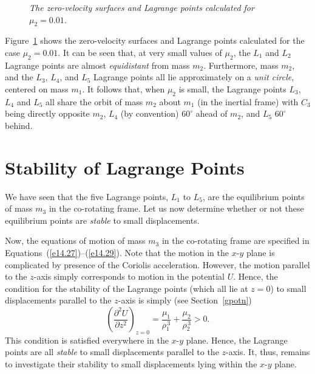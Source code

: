 \begin{figure}
\epsfysize=5in
\centerline{}
\caption{\em The zero-velocity surfaces and Lagrange points calculated for $\mu_2=0.01$.}\label{fzer}
\end{figure}

Figure~\ref{fzer} shows the zero-velocity surfaces and Lagrange points
calculated for the case $\mu_2=0.01$. It can be seen that, at very small values of
$\mu_2$, the $L_1$ and $L_2$ Lagrange points are almost {\em equidistant}\/ from mass $m_2$.
Furthermore, mass $m_2$, and the  $L_3$, $L_4$, and $L_5$ Lagrange points all lie  approximately  
on a {\em unit circle}, 
centered on mass $m_1$. It follows that, when $\mu_2$ is small, the Lagrange points $L_3$, $L_4$ and $L_5$ all
share the orbit of mass $m_2$ about $m_1$ (in the inertial frame) with $C_3$ being directly opposite $m_2$,
$L_4$ (by convention) $60^\circ$ ahead of $m_2$, and $L_5$ $60^\circ$ behind.

\section{Stability of Lagrange Points}
We have seen that the five Lagrange points, $L_1$ to $L_5$, are the equilibrium points
of mass $m_3$ in the co-rotating frame. Let us now determine whether or not
these equilibrium points are {\em stable}\/ to small displacements. 

Now, the equations of motion of mass $m_3$ in the co-rotating frame are
specified in Equations~(\ref{e14.27})--(\ref{e14.29}). Note that the motion
in the $x$-$y$ plane is complicated by presence of  the Coriolis acceleration. However, the motion parallel to the $z$-axis simply
corresponds to motion in the potential $U$. Hence, the condition for 
the stability of the Lagrange points (which all lie at $z=0$) to small displacements parallel
to the $z$-axis is simply (see Section~\ref{gpotn})
\begin{equation}
\left(\frac{\partial^2 U}{\partial z^2}\right)_{z=0} = \frac{\mu_1}{\rho_1^{\,3}} + \frac{\mu_2}{\rho_2^{\,3}}>0.
\end{equation}
This condition is satisfied everywhere in the $x$-$y$ plane. Hence, the Lagrange points are all
{\em stable}\/ to small displacements parallel to the $z$-axis. It, thus, remains to investigate
their stability to small displacements lying within the $x$-$y$ plane.

